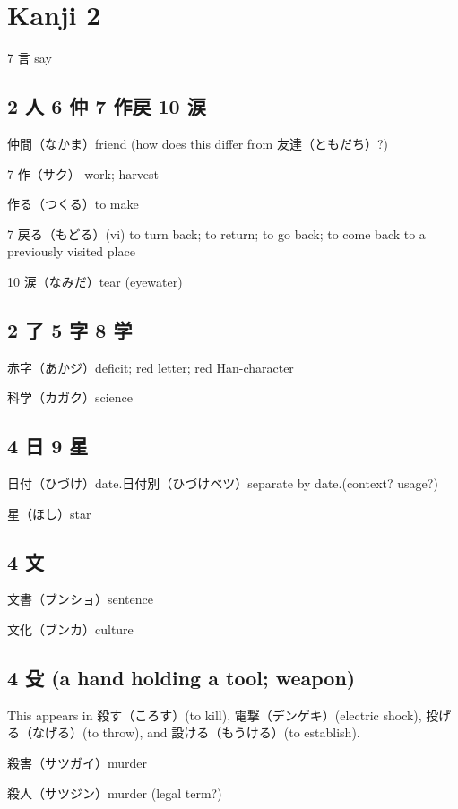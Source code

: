 \chapter{Kanji 2}

7 言 say

\section{2 人 6 仲 7 作戻 10 涙}

仲間（なかま）friend (how does this differ from 友達（ともだち）?)

7 作（サク） work; harvest

作る（つくる）to make

7 戻る（もどる）(vi) to turn back; to return; to go back;
to come back to a previously visited place

10 涙（なみだ）tear (eyewater)

\section{2 了 5 字 8 学}

赤字（あかジ）deficit; red letter; red Han-character

科学（カガク）science

\section{4 日 9 星}

日付（ひづけ）date.日付別（ひづけベツ）separate by date.(context? usage?)

星（ほし）star

\section{4 文}

文書（ブンショ）sentence

文化（ブンカ）culture

\section{4 殳 (a hand holding a tool; weapon)}

This appears in
殺す（ころす）(to kill),
電撃（デンゲキ）(electric shock),
投げる（なげる）(to throw),
and 設ける（もうける）(to establish).

殺害（サツガイ）murder

殺人（サツジン）murder (legal term?)

